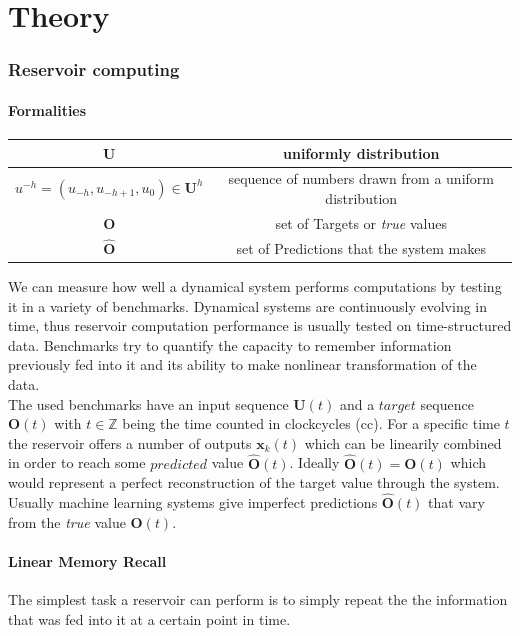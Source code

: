 \chapter{Theory}

\subsection{Reservoir computing}


	\subsubsection{Formalities}

\begin{tabular}{c|c}
	\hline
	\textbf{U}& uniformly distribution \\
	\hline
	$u^{-h}=(u_{-h},u_{-h+1},u_{0}) \in \textbf{U}^h$ & sequence of numbers drawn from a uniform distribution  \\	
	\hline
	$\textbf{O}$ & set of Targets or \emph{true} values \\
	\hline
	$\hat{\textbf{O}}$ & set of Predictions that the system makes\\
	\hline
\end{tabular}


We can measure how well a dynamical system performs computations by testing it in a variety of benchmarks. Dynamical systems are continuously evolving in time, thus reservoir computation performance is usually tested on time-structured data. Benchmarks try to quantify the capacity to remember information previously fed into it and its ability to make nonlinear transformation of the data.\\ 

The used benchmarks have an input sequence $\textbf{U}(t)$ and a $target$ sequence $\textbf{O}(t)$ with $t \in \mathbb{Z}$ being the time counted in clockcycles (cc). For a specific time $t$ the reservoir offers a number of outputs $\textbf{x}_{k}(t)$ which can be linearily combined in order to reach some $predicted$ value $\hat{\textbf{O}}(t)$. Ideally $\hat{\textbf{O}}(t) = \textbf{O}(t)$ which would represent a perfect reconstruction of the target value through the system. Usually machine learning systems give imperfect predictions $\hat{\textbf{O}}(t)$ that vary from the \emph{true} value $\textbf{O}(t)$.

\subsubsection{Linear Memory Recall}
The simplest task a reservoir can perform is to simply repeat the the information that was fed into it at a certain point in time. 


